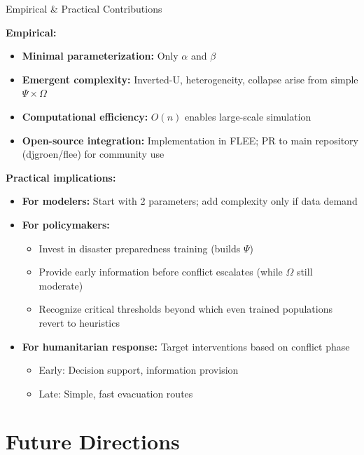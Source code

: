 \documentclass[aspectratio=169]{beamer}
\begin{document}
\begin{frame}{Empirical \& Practical Contributions}

\textbf{Empirical:}
\begin{itemize}
    \item \textbf{Minimal parameterization:} Only $\alpha$ and $\beta$
    \item \textbf{Emergent complexity:} Inverted-U, heterogeneity, collapse arise from simple $\Psi \times \Omega$
    \item \textbf{Computational efficiency:} $O(n)$ enables large-scale simulation
    \item \textbf{Open-source integration:} Implementation in FLEE; PR to main repository (djgroen/flee) for community use
\end{itemize}

\vspace{0.5em}

\textbf{Practical implications:}
\begin{itemize}
    \item \textbf{For modelers:} Start with 2 parameters; add complexity only if data demand
    \item \textbf{For policymakers:}
    \begin{itemize}
        \item Invest in disaster preparedness training (builds $\Psi$)
        \item Provide early information before conflict escalates (while $\Omega$ still moderate)
        \item Recognize critical thresholds beyond which even trained populations revert to heuristics
    \end{itemize}
    \item \textbf{For humanitarian response:} Target interventions based on conflict phase
    \begin{itemize}
        \item Early: Decision support, information provision
        \item Late: Simple, fast evacuation routes
    \end{itemize}
\end{itemize}

\end{frame}

\section{Future Directions}
\end{document}
